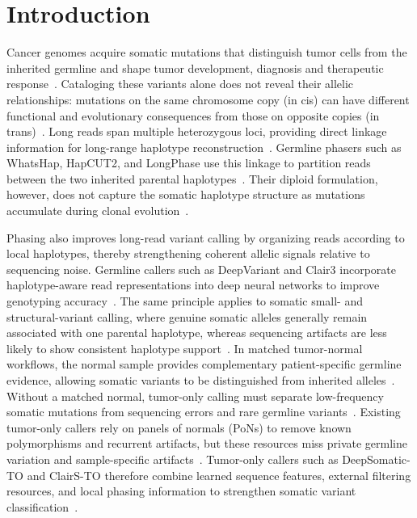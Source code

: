 \documentclass[unnumsec,webpdf,contemporary,large]{oup-authoring-template}
\begin{document}
\section{Introduction}

Cancer genomes acquire somatic mutations that distinguish tumor cells from the inherited germline and shape tumor development, diagnosis and therapeutic response~\cite{vogelstein2013,stratton2009,vogelstein2004}. Cataloging these variants alone does not reveal their allelic relationships: mutations on the same chromosome copy (in cis) can have different functional and evolutionary consequences from those on opposite copies (in trans)~\cite{garg2021,glusman2014}. Long reads span multiple heterozygous loci, providing direct linkage information for long-range haplotype reconstruction~\cite{warburton2023,maestri2020}. Germline phasers such as WhatsHap, HapCUT2, and LongPhase use this linkage to partition reads between the two inherited parental haplotypes~\cite{martin2016,edge2017,lin2022}. Their diploid formulation, however, does not capture the somatic haplotype structure as mutations accumulate during clonal evolution~\cite{nowell1976}.

Phasing also improves long-read variant calling by organizing reads according to local haplotypes, thereby strengthening coherent allelic signals relative to sequencing noise. Germline callers such as DeepVariant and Clair3 incorporate haplotype-aware read representations into deep neural networks to improve genotyping accuracy~\cite{poplin2018,kolesnikov2023,zheng2022}. The same principle applies to somatic small- and structural-variant calling, where genuine somatic alleles generally remain associated with one parental haplotype, whereas sequencing artifacts are less likely to show consistent haplotype support~\cite{park2024,zheng2023,keskus2025}. In matched tumor-normal workflows, the normal sample provides complementary patient-specific germline evidence, allowing somatic variants to be distinguished from inherited alleles~\cite{cibulskis2013,koboldt2012,larson2012}. Without a matched normal, tumor-only calling must separate low-frequency somatic mutations from sequencing errors and rare germline variants~\cite{sun2018,hiltemann2015,huang2018}. Existing tumor-only callers rely on panels of normals (PoNs) to remove known polymorphisms and recurrent artifacts, but these resources miss private germline variation and sample-specific artifacts~\cite{cibulskis2013}. Tumor-only callers such as DeepSomatic-TO and ClairS-TO therefore combine learned sequence features, external filtering resources, and local phasing information to strengthen somatic variant classification~\cite{park2024,chen2025}.
\end{document}
